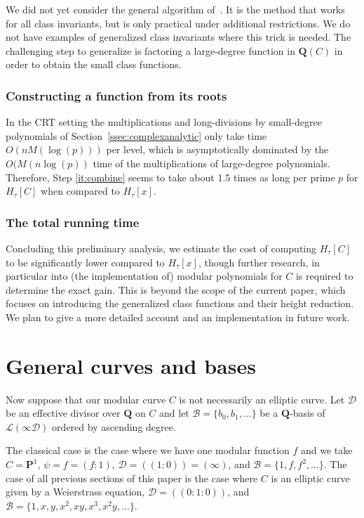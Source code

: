 \documentclass{amsart}
\newcommand{\QQ}{\mathbf{Q}}
\newcommand{\PP}{\mathbf{P}}
\newcommand{\HC}{H_\tau[\curve]}
\newcommand{\Hx}{H_\tau[x]}
\newcommand{\D}{\mathcal{D}}
\newcommand{\mc}{\mathcal}
\newcommand{\curve}{C}
\numberwithin{equation}{section}
\theoremstyle{definition}
\begin{document}
We did not yet consider the general algorithm of~\cite[Section~4.4]{enge-sutherland2010}.
It is the method that works for all class invariants,
but is only practical under additional restrictions.
We do not have examples of generalized class invariants
where this trick is needed. The challenging step to generalize
is factoring a large-degree function in $\QQ(C)$ in order to obtain the small
class functions.
    
    \subsubsection{Constructing a function from its roots}
    
 In the CRT setting the multiplications and long-divisions by
small-degree polynomials of Section~\ref{ssec:complexanalytic}
only take time $O(nM(\log(p)))$ per level, which is asymptotically
dominated by the $O(M(n\log(p))$ time of the multiplications
of large-degree polynomials. Therefore, 
Step \ref{it:combine} seems to take about 1.5 times as long
per prime $p$ for $\HC$ when compared to $\Hx$.
    
    \subsubsection{The total running time}

    Concluding this preliminary analysis, we estimate the cost of computing $\HC$ to be significantly lower compared to $\Hx$, though further research, in particular into (the implementation of) modular polynomials for $C$ is required to determine the exact gain. This is beyond the scope of the current paper, which focuses on introducing the generalized class functions and their height reduction.
    We plan to give a more detailed account and an implementation
    in future work.
    
	\section{General curves and bases}\label{sec:general}
	    
    Now suppose that our modular curve
    $\curve$ is not necessarily an elliptic curve.
	Let $\D$ be an effective divisor over
	$\QQ$ on $\curve$
	and let $\mc{B}=\{b_0,b_1,\ldots\}$ be a
	$\QQ$-basis of $\mc{L}(\infty\mc{D})$ ordered by ascending degree. 

	The classical case is the case where we have one modular function $f$
	and we take $\curve = \PP^1$, $\psi = f  = (f:1)$, $\D = ((1:0))=(\infty)$, and $\mc{B}=\{1,f,f^2,\ldots\}$.
	The case of all previous sections of this paper is the case where
	$\curve$ is an elliptic curve given by a Weierstrass equation, $\D = ((0:1:0))$, and $\mc{B}=\{1,x,y,x^2,xy,x^3,x^2y,\ldots\}$.
	
\end{document}
